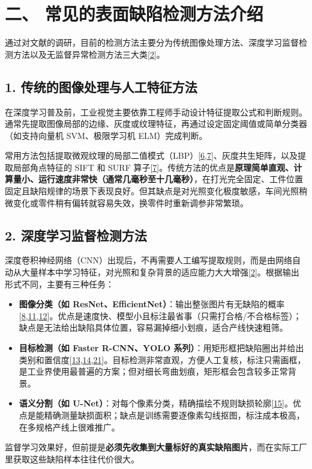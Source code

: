 \section*{二、 常见的表面缺陷检测方法介绍}

通过对文献的调研，目前的检测方法主要分为传统图像处理方法、深度学习监督检测方法以及无监督异常检测方法三大类[\hyperlink{ref:2}{2}]。

\subsection*{1. 传统的图像处理与人工特征方法}
在深度学习普及前，工业视觉主要依靠工程师手动设计特征提取公式和判断规则。通常先提取图像局部的边缘、灰度或纹理特征，再通过设定固定阈值或简单分类器（如支持向量机 SVM、极限学习机 ELM）完成判断。

常用方法包括提取微观纹理的局部二值模式（LBP）[\hyperlink{ref:6}{6},\hyperlink{ref:7}{7}]、灰度共生矩阵，以及提取局部角点特征的 SIFT 和 SURF 算子[\hyperlink{ref:7}{7}]。传统方法的优点是\textbf{原理简单直观、计算量小、运行速度非常快（通常几毫秒至十几毫秒）}，在打光完全固定、工件位置固定且缺陷规律的场景下表现良好。但其缺点是对光照变化极度敏感，车间光照稍微变化或零件稍有偏转就容易失效，换零件时重新调参非常繁琐。

\subsection*{2. 深度学习监督检测方法}
深度卷积神经网络（CNN）出现后，不再需要人工编写提取规则，而是由网络自动从大量样本中学习特征，对光照和复杂背景的适应能力大大增强[\hyperlink{ref:2}{2}]。根据输出形式不同，主要有三种任务：
\begin{itemize}
\item \textbf{图像分类（如 ResNet、EfficientNet）}：输出整张图片有无缺陷的概率[\hyperlink{ref:8}{8},\hyperlink{ref:11}{11},\hyperlink{ref:12}{12}]。优点是速度快、模型小且标注最省事（只需打合格/不合格标签）；缺点是无法给出缺陷具体位置，容易漏掉细小划痕，适合产线快速粗筛。
\item \textbf{目标检测（如 Faster R-CNN、YOLO 系列）}：用矩形框把缺陷圈出并给出类别和置信度[\hyperlink{ref:13}{13},\hyperlink{ref:14}{14},\hyperlink{ref:21}{21}]。目标检测非常直观，方便人工复核，标注只需画框，是工业界使用最普遍的方案；但对细长弯曲划痕，矩形框会包含较多正常背景。
\item \textbf{语义分割（如 U-Net）}：对每个像素分类，精确描绘不规则缺损轮廓[\hyperlink{ref:15}{15}]。优点是能精确测量缺损面积；缺点是训练需要逐像素勾线抠图，标注成本极高，在多规格产线上很难推广。

\end{itemize}
监督学习效果好，但前提是\textbf{必须先收集到大量标好的真实缺陷图片}，而在实际工厂里获取这些缺陷样本往往代价很大。

